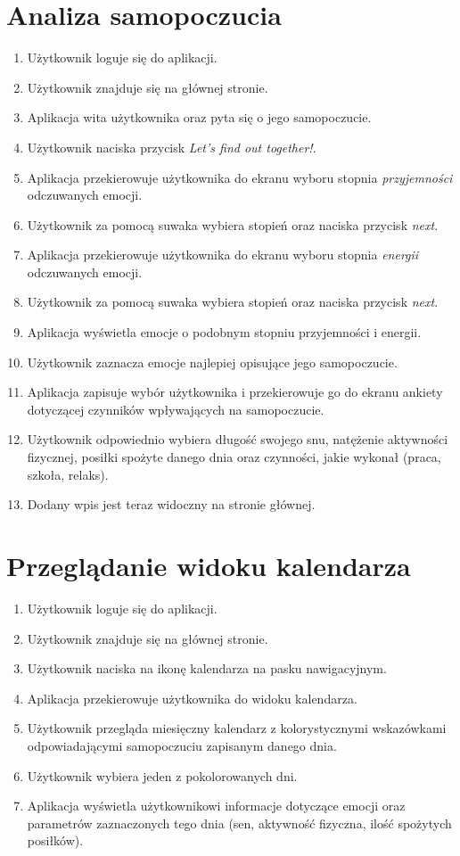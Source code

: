 \documentclass[inz, shortabstract]{iithesis}
\begin{document}
\section{Analiza samopoczucia}
\begin{enumerate}
	\item Użytkownik loguje się do aplikacji.
	\item Użytkownik znajduje się na głównej stronie.
	\item Aplikacja wita użytkownika oraz pyta się o jego samopoczucie.
	\item Użytkownik naciska przycisk \textit{Let's find out together!}.
	\item Aplikacja przekierowuje użytkownika do ekranu wyboru stopnia \textit{przyjemności} odczuwanych emocji.
	\item Użytkownik za pomocą suwaka wybiera stopień oraz naciska przycisk \textit{next}.
	\item Aplikacja przekierowuje użytkownika do ekranu wyboru stopnia \textit{energii} odczuwanych emocji.
	\item Użytkownik za pomocą suwaka wybiera stopień oraz naciska przycisk \textit{next}.
	\item Aplikacja wyświetla emocje o podobnym stopniu przyjemności i energii.
	\item Użytkownik zaznacza emocje najlepiej opisujące jego samopoczucie.
	\item Aplikacja zapisuje wybór użytkownika i przekierowuje go do ekranu ankiety dotyczącej czynników wpływających na samopoczucie.
	\item Użytkownik odpowiednio wybiera długość swojego snu, natężenie aktywności fizycznej, posiłki spożyte danego dnia oraz czynności, jakie wykonał (praca, szkoła, relaks).
	\item Dodany wpis jest teraz widoczny na stronie głównej.
\end{enumerate}

\section{Przeglądanie widoku kalendarza}
\begin{enumerate}
	\item Użytkownik loguje się do aplikacji.
	\item Użytkownik znajduje się na głównej stronie.
	\item Użytkownik naciska na ikonę kalendarza na pasku nawigacyjnym.
	\item Aplikacja przekierowuje użytkownika do widoku kalendarza.
	\item Użytkownik przegląda miesięczny kalendarz z kolorystycznymi wskazówkami odpowiadającymi samopoczuciu zapisanym danego dnia.
	\item Użytkownik wybiera jeden z pokolorowanych dni.
	\item Aplikacja wyświetla użytkownikowi informacje dotyczące emocji oraz parametrów zaznaczonych tego dnia (sen, aktywność fizyczna, ilość spożytych posiłków).
\end{enumerate}
\end{document}

